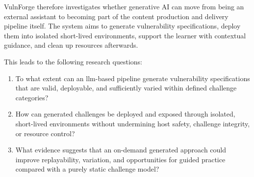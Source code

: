 VulnForge therefore investigates whether generative AI can move from being an external assistant to becoming part of the content production and delivery pipeline itself. The system aims to generate vulnerability specifications, deploy them into isolated short-lived environments, support the learner with contextual guidance, and clean up resources afterwards.

This leads to the following research questions:
\begin{enumerate}
	\item To what extent can an \gls{llm}-based pipeline generate vulnerability specifications that are valid, deployable, and sufficiently varied within defined challenge categories?
	\item How can generated challenges be deployed and exposed through isolated, short-lived environments without undermining host safety, challenge integrity, or resource control?
	\item What evidence suggests that an on-demand generated approach could improve replayability, variation, and opportunities for guided practice compared with a purely static challenge model?
\end{enumerate}
